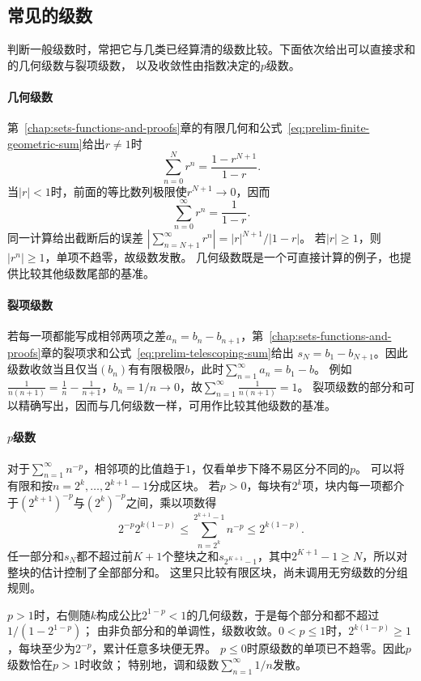 \subsection{常见的级数}
\label{sec:analysis-common-series}

判断一般级数时，常把它与几类已经算清的级数比较。下面依次给出可以直接求和的几何级数与裂项级数，
以及收敛性由指数决定的$p$级数。

\paragraph{几何级数}
第~\ref{chap:sets-functions-and-proofs}章的有限几何和公式~\eqref{eq:prelim-finite-geometric-sum}给出$r\neq1$时
\[
 \sum_{n=0}^{N}r^n=\frac{1-r^{N+1}}{1-r}.
\]
当$|r|<1$时，前面的等比数列极限使$r^{N+1}\to0$，因而
\begin{equation}
 \sum_{n=0}^{\infty}r^n=\frac{1}{1-r}.
\label{eq:analysis-geometric-series}
\end{equation}
同一计算给出截断后的误差
$|\sum_{n=N+1}^{\infty}r^n|=|r|^{N+1}/|1-r|$。
若$|r|\geq1$，则$|r^n|\geq1$，单项不趋零，故级数发散。
几何级数既是一个可直接计算的例子，也提供比较其他级数尾部的基准。

\paragraph{裂项级数}
若每一项都能写成相邻两项之差$a_n=b_n-b_{n+1}$，第~\ref{chap:sets-functions-and-proofs}章的裂项求和公式~\eqref{eq:prelim-telescoping-sum}给出
$s_N=b_1-b_{N+1}$。因此级数收敛当且仅当$(b_n)$有有限极限$b$，此时$\sum_{n=1}^\infty a_n=b_1-b$。
例如$\frac1{n(n+1)}=\frac1n-\frac1{n+1}$，$b_n=1/n\to0$，故$\sum_{n=1}^\infty\frac1{n(n+1)}=1$。
裂项级数的部分和可以精确写出，因而与几何级数一样，可用作比较其他级数的基准。

\paragraph{$p$级数}
对于$\sum_{n=1}^{\infty}n^{-p}$，相邻项的比值趋于$1$，仅看单步下降不易区分不同的$p$。
可以将有限和按$n=2^k,\ldots,2^{k+1}-1$分成区块。
若$p>0$，每块有$2^k$项，块内每一项都介于$(2^{k+1})^{-p}$与$(2^k)^{-p}$之间，乘以项数得
\[
 2^{-p}2^{k(1-p)}
 \leq\sum_{n=2^k}^{2^{k+1}-1}n^{-p}
 \leq2^{k(1-p)}.
\]
任一部分和$s_N$都不超过前$K+1$个整块之和$s_{2^{K+1}-1}$，其中$2^{K+1}-1\geq N$，所以对整块的估计控制了全部部分和。
这里只比较有限区块，尚未调用无穷级数的分组规则。

$p>1$时，右侧随$k$构成公比$2^{1-p}<1$的几何级数，于是每个部分和都不超过$1/(1-2^{1-p})$；
由非负部分和的单调性，级数收敛。$0<p\leq1$时，$2^{k(1-p)}\geq1$，每块至少为$2^{-p}$，累计任意多块便无界。
$p\leq0$时原级数的单项已不趋零。因此$p$级数恰在$p>1$时收敛；
特别地，调和级数$\sum_{n=1}^{\infty}1/n$发散。

